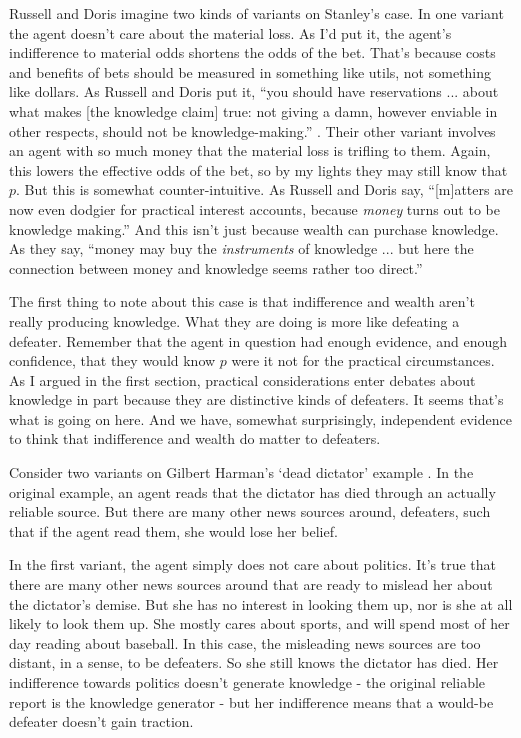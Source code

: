 \documentclass[11pt,oneside]{book}
\begin{document}
Russell and Doris imagine two kinds of variants on Stanley's case. In one variant the agent doesn't care about the material loss. As I'd put it, the agent's indifference to material odds shortens the odds of the bet. That's because costs and benefits of bets should be measured in something like utils, not something like dollars. As Russell and Doris put it, ``you should have reservations ... about what makes [the knowledge claim] true: not giving a damn, however enviable in other respects, should not be knowledge-making.'' \citep[432]{RussellDoris2008}. Their other variant involves an agent with so much money that the material loss is trifling to them. Again, this lowers the effective odds of the bet, so by my lights they may still know that \(p\). But this is somewhat counter-intuitive. As Russell and Doris say, ``[m]atters are now even dodgier for practical interest accounts, because \textit{money} turns out to be knowledge making.'' \citep[433]{RussellDoris2008} And this isn't just because wealth can purchase knowledge. As they say, ``money may buy the \textit{instruments} of knowledge ... but here the connection between money and knowledge seems rather too direct.'' \citep[433]{RussellDoris2008}

The first thing to note about this case is that indifference and wealth aren't really producing knowledge. What they are doing is more like defeating a defeater. Remember that the agent in question had enough evidence, and enough confidence, that they would know \(p\) were it not for the practical circumstances. As I argued in the first section, practical considerations enter debates about knowledge in part because they are distinctive kinds of defeaters. It seems that's what is going on here. And we have, somewhat surprisingly, independent evidence to think that indifference and wealth do matter to defeaters.

Consider two variants on Gilbert Harman's `dead dictator' example \citep[75]{Harman1973}. In the original example, an agent reads that the dictator has died through an actually reliable source. But there are many other news sources around, defeaters, such that if the agent read them, she would lose her belief. 

In the first variant, the agent simply does not care about politics. It's true that there are many other news sources around that are ready to mislead her about the dictator's demise. But she has no interest in looking them up, nor is she at all likely to look them up. She mostly cares about sports, and will spend most of her day reading about baseball. In this case, the misleading news sources are too distant, in a sense, to be defeaters. So she still knows the dictator has died. Her indifference towards politics doesn't generate knowledge - the original reliable report is the knowledge generator - but her indifference means that a would-be defeater doesn't gain traction.
\end{document}
